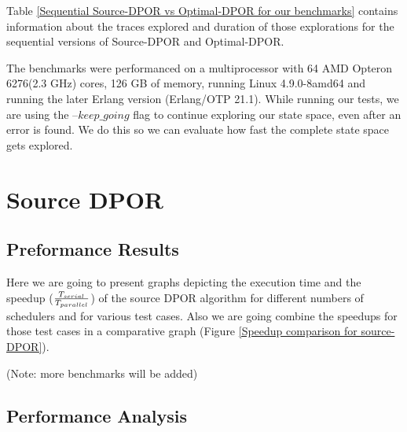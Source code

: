 Table \ref{Sequential Source-DPOR vs Optimal-DPOR for our benchmarks} contains information about the traces explored and duration of those
explorations for the sequential versions of Source-DPOR and Optimal-DPOR.


The benchmarks were performanced on a multiprocessor with 64 AMD Opteron 6276(2.3 GHz) cores, 126 GB of memory, running
Linux 4.9.0-8amd64 and running the later Erlang version (Erlang/OTP 21.1). While running our tests, we are using the
--$keep\_going$ flag to continue exploring our state space, even after an error is found. We do this so we can evaluate
how fast the complete state space gets explored.

\section{Source DPOR}

\subsection{Preformance Results}

Here we are going to present graphs depicting the execution time and the speedup ($T_{serial} 
\over T_{parallel}$) of the source DPOR algorithm
for different numbers of schedulers and for various test cases. Also we are going combine the 
speedups for those test cases in a comparative graph (Figure \ref{Speedup comparison for source-DPOR}).

(Note: more benchmarks will be added)

\iffalse
\mediumGraph{scripts/indexer15_time.png}{Execution time for indexer 15}
\mediumGraph{scripts/readers15_time.png}{Execution time for readers 15}
\mediumGraph{scripts/writers11_time.png}{Execution time for writers 11}

\mediumGraph{scripts/indexer15_speedup.png}{Speedup for indexer 15}
\mediumGraph{scripts/readers15_speedup.png}{Speedup time for readers 15}
\mediumGraph{scripts/writers11_speedup.png}{Speedup time for writers 11}
\fi

\subsection{Performance Analysis}

